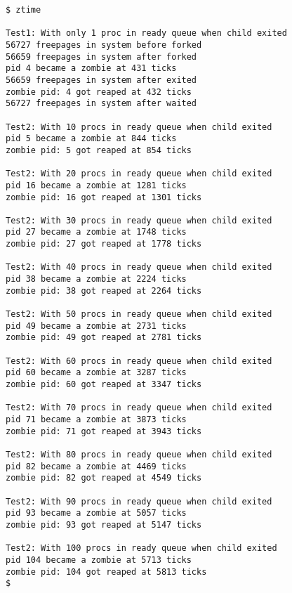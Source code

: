 \documentclass[varwidth,crop]{standalone}
\begin{document}
\begin{verbatim}
$ ztime

Test1: With only 1 proc in ready queue when child exited
56727 freepages in system before forked 
56659 freepages in system after forked
pid 4 became a zombie at 431 ticks
56659 freepages in system after exited
zombie pid: 4 got reaped at 432 ticks
56727 freepages in system after waited

Test2: With 10 procs in ready queue when child exited
pid 5 became a zombie at 844 ticks
zombie pid: 5 got reaped at 854 ticks

Test2: With 20 procs in ready queue when child exited
pid 16 became a zombie at 1281 ticks
zombie pid: 16 got reaped at 1301 ticks

Test2: With 30 procs in ready queue when child exited
pid 27 became a zombie at 1748 ticks
zombie pid: 27 got reaped at 1778 ticks

Test2: With 40 procs in ready queue when child exited
pid 38 became a zombie at 2224 ticks
zombie pid: 38 got reaped at 2264 ticks

Test2: With 50 procs in ready queue when child exited
pid 49 became a zombie at 2731 ticks
zombie pid: 49 got reaped at 2781 ticks

Test2: With 60 procs in ready queue when child exited
pid 60 became a zombie at 3287 ticks
zombie pid: 60 got reaped at 3347 ticks

Test2: With 70 procs in ready queue when child exited
pid 71 became a zombie at 3873 ticks
zombie pid: 71 got reaped at 3943 ticks

Test2: With 80 procs in ready queue when child exited
pid 82 became a zombie at 4469 ticks
zombie pid: 82 got reaped at 4549 ticks

Test2: With 90 procs in ready queue when child exited
pid 93 became a zombie at 5057 ticks
zombie pid: 93 got reaped at 5147 ticks

Test2: With 100 procs in ready queue when child exited
pid 104 became a zombie at 5713 ticks
zombie pid: 104 got reaped at 5813 ticks
$ 
\end{verbatim}
\end{document}
